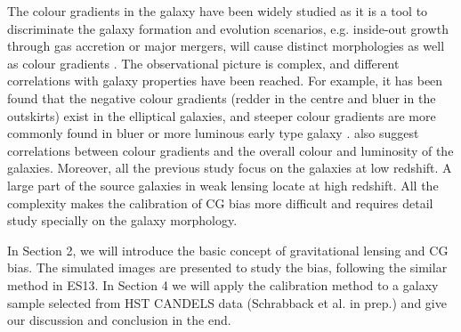 \documentclass[useAMS,usenatbib]{mn2e}
\begin{document}
The colour gradients in the galaxy have been widely studied as it is
a tool to discriminate the galaxy formation and evolution scenarios,
e.g. inside-out growth through gas accretion or major mergers, will
cause distinct morphologies as well as colour gradients
\citep[e.g.][]{2010MNRAS.407..144T}. The observational picture is
complex, and different correlations with galaxy properties have been
reached. For example, it has been found that the negative colour
gradients (redder in the centre and bluer in the outskirts) exist in
the elliptical galaxies, and steeper colour gradients are more
commonly found in bluer or more luminous early type galaxy
\citep[e.g.][]{2011MNRAS.414.3052D,2011MNRAS.411.1151G}.
\citet[][]{2010AJ....140.1528L, 2016A&A...593A..84K} also suggest
correlations between colour gradients and the overall colour and
luminosity of the galaxies. Moreover, all the previous study focus on
the galaxies at low redshift. A large part of the source galaxies in
weak lensing locate at high redshift. All the complexity makes the
calibration of CG bias more difficult and requires detail study
specially on the galaxy morphology.

In Section 2, we will introduce the basic concept of gravitational
lensing and CG bias. The simulated images are presented to study the
bias, following the similar method in ES13. In Section 4 we will apply
the calibration method to a galaxy sample selected from HST CANDELS
data (Schrabback et al. in prep.) and give our discussion and
conclusion in the end.


\end{document}
